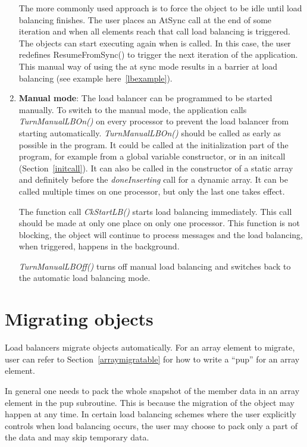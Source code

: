 \begin{enumerate}
The more commonly used approach is to force the object to be idle until load
balancing finishes. The user places an AtSync call at the end of some iteration
and when all elements reach that call load balancing is triggered. The objects
can start executing again when  is called. In this case,
the user redefines ResumeFromSync() to trigger the next iteration of the
application. This manual way of using the at sync mode results in a barrier at
load balancing (see example here~\ref{lbexample}).
%
\item {\bf Manual mode}: The load balancer can be programmed to be started
manually. To switch to the manual mode, the application calls {\em TurnManualLBOn()}
on every processor to prevent the load balancer from starting automatically. {\em
TurnManualLBOn()} should be called as early as possible in the program. It
could be called at the initialization part of the program, for example from a
global variable constructor, or in an initcall (Section~\ref{initcall}).  It can also be
called in the constructor of a static array and definitely before the {\em
doneInserting} call for a dynamic array.  It can be called multiple times on
one processor, but only the last one takes effect.

The function call {\em CkStartLB()} starts load balancing immediately. This call
should be made at only one place on only one processor. This function is
not blocking, the object will continue to process messages and the load
balancing, when triggered, happens in the background.

{\em TurnManualLBOff()} turns off manual load balancing and switches back to
the automatic load balancing mode.
%
\end{enumerate}

\section{Migrating objects}
\label{lbmigobj}

Load balancers migrate objects automatically.
For an array element to migrate, user can refer to Section~\ref{arraymigratable}
for how to write a ``pup'' for an array element.

In general one needs to pack the whole snapshot of the member data in an 
array element in the pup subroutine. This is because the migration of
the object may happen at any time. In certain load balancing schemes where
 the user explicitly controls when load balancing occurs, the user may choose
to pack only a part of the data and may skip temporary data.

